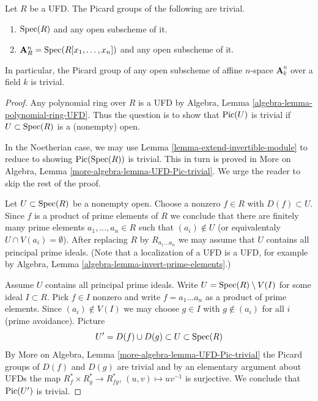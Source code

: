\begin{lemma}
\label{lemma-open-subscheme-UFD}
Let $R$ be a UFD. The Picard groups of the following are
trivial.
\begin{enumerate}
\item $\mathop{\mathrm{Spec}}(R)$ and any open subscheme of it.
\item $\mathbf{A}^n_R = \mathop{\mathrm{Spec}}(R[x_1, \ldots, x_n])$ and any open subscheme
of it.
\end{enumerate}
In particular, the Picard group of any open subscheme of affine
$n$-space $\mathbf{A}^n_k$ over a field $k$ is trivial.
\end{lemma}

\begin{proof}
Any polynomial ring over $R$ is a UFD by
Algebra, Lemma \ref{algebra-lemma-polynomial-ring-UFD}.
Thus the question is to show that $\mathop{\mathrm{Pic}}\nolimits(U)$ is trivial
if $U \subset \mathop{\mathrm{Spec}}(R)$ is a (nonempty) open.

\medskip\noindent
In the Noetherian case, we may use Lemma \ref{lemma-extend-invertible-module}
to reduce to showing $\mathop{\mathrm{Pic}}\nolimits(\mathop{\mathrm{Spec}}(R))$ is trivial. This in turn is
proved in More on Algebra, Lemma \ref{more-algebra-lemma-UFD-Pic-trivial}.
We urge the reader to skip the rest of the proof.

\medskip\noindent
Let $U \subset \mathop{\mathrm{Spec}}(R)$ be a nonempty open. Choose a nonzero $f \in R$
with $D(f) \subset U$. Since $f$ is a product of prime elements of $R$
we conclude that there are finitely many prime elements
$a_1, \ldots, a_n \in R$ such that $(a_i) \not \in U$ (or
equivalentaly $U \cap V(a_i) = \emptyset$).
After replacing $R$ by $R_{a_1 \ldots a_n}$ we may assume that
$U$ contains all principal prime ideals. (Note that a localization
of a UFD is a UFD, for example by Algebra, Lemma
\ref{algebra-lemma-invert-prime-elements}.)

\medskip\noindent
Assume $U$ contains all principal prime ideals.
Write $U = \mathop{\mathrm{Spec}}(R) \setminus V(I)$ for some ideal $I \subset R$.
Pick $f \in I$ nonzero and write $f = a_1 \ldots a_n$ as a product
of prime elements. Since $(a_i) \not \in V(I)$ we may choose $g \in I$ with
$g \not \in (a_i)$ for all $i$ (prime avoidance). Picture
$$
U' = D(f) \cup D(g) \subset U \subset \mathop{\mathrm{Spec}}(R)
$$
By More on Algebra, Lemma \ref{more-algebra-lemma-UFD-Pic-trivial}
the Picard groups of $D(f)$ and $D(g)$ are trivial and by an elementary
argument about UFDs the map $R_f^* \times R_g^* \to R_{fg}^*$,
$(u, v) \mapsto uv^{-1}$ is surjective. We conclude that
$\mathop{\mathrm{Pic}}\nolimits(U')$ is trivial.


\end{proof}
